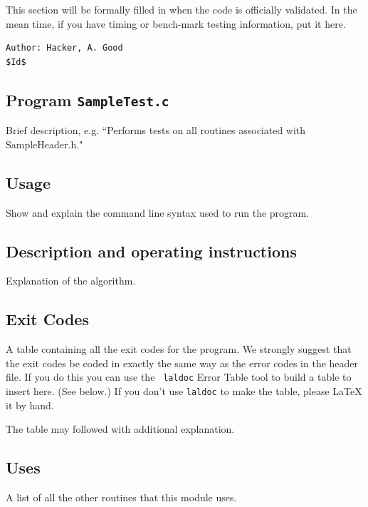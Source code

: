 \documentclass[oneside]{book}
\begin{document}
This section will be formally filled in when the code is officially
validated. In the mean time, if you have timing or bench-mark testing
information, put it here.


\vfill{\footnotesize{
\vspace{-1ex}
\mbox{}
\vspace{-3ex}
\begin{verbatim}
Author: Hacker, A. Good
$Id$
\end{verbatim}
}}

\newpage

\subsection*{Program {\texttt {SampleTest.c}}}
Brief description, e.g. ``Performs tests on all routines associated with
SampleHeader.h."

\subsection*{Usage}
Show and explain the command line syntax used to run the program.

\subsection*{Description and operating instructions}
Explanation of the algorithm.

\subsection*{Exit Codes}

A table containing all the exit codes for the program.  We strongly
suggest that the exit codes be coded in exactly the same way as the
error codes in the header file.  If you do this you can use the {\tt
laldoc} Error Table tool to build a table to insert here. (See below.)
If you don't use {\tt laldoc} to make the table, please {\LaTeX} it by
hand.

The table may followed with additional explanation.

\subsection*{Uses}

A list of all the other routines that this module uses.
\end{document}
